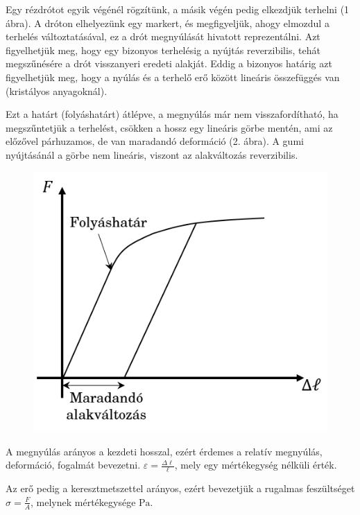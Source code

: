 \documentclass[a4paper, 12pt]{article}
\begin{document}
        Egy rézdrótot egyik végénél rögzítünk, a másik végén pedig elkezdjük terhelni (1 ábra). A dróton         elhelyezünk egy markert, és megfigyeljük, ahogy elmozdul a terhelés változtatásával, ez a drót megnyúlását hivatott reprezentálni. Azt figyelhetjük meg, hogy egy bizonyos terhelésig a nyújtás reverzibilis, tehát megszűnésére a drót visszanyeri eredeti alakját. Eddig a bizonyos határig azt figyelhetjük meg, hogy a nyúlás és a terhelő erő között lineáris összefüggés van (kristályos anyagoknál). 
        
        Ezt a határt (folyáshatárt) átlépve, a megnyúlás már nem visszafordítható, ha megszűntetjük a terhelést, csökken a hossz egy lineáris görbe mentén, ami az előzővel párhuzamos, de van maradandó deformáció (2. ábra). A gumi nyújtásánál a görbe nem lineáris, viszont az alakváltozás reverzibilis.
        
\begin{figure}[h]
\centering
\includegraphics[scale=0.5]{tetel1_2.png}
\caption{}
\end{figure}

A megnyúlás arányos a kezdeti hosszal, ezért érdemes a relatív megnyúlás, deformáció, fogalmát bevezetni. $\varepsilon=\frac{\Delta\ell}{\ell}$, mely egy mértékegység nélküli érték. 

Az erő pedig a keresztmetszettel arányos, ezért bevezetjük a rugalmas feszültséget $\sigma=\frac{F}{A}$, melynek mértékegysége $\mathrm{Pa}$. 
\end{document}
